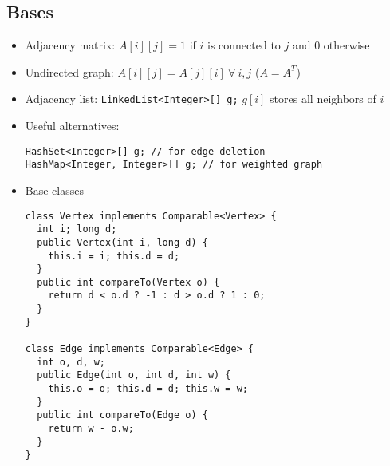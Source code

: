 \subsection{Bases}
\begin{itemize}
\item Adjacency matrix: $A[i][j] = 1$ if $i$ is connected to $j$ and $0$ otherwise
\item Undirected graph: $A[i][j] = A[j][i]\ \forall\ i,j$ ($A = A^T$)
\item Adjacency list: \lstinline|LinkedList<Integer>[] g;|
$g[i]$ stores all neighbors of $i$
\item Useful alternatives: 
\begin{lstlisting}
HashSet<Integer>[] g; // for edge deletion
HashMap<Integer, Integer>[] g; // for weighted graph
\end{lstlisting}
\item Base classes
\begin{lstlisting}
class Vertex implements Comparable<Vertex> {
  int i; long d;
  public Vertex(int i, long d) { 
  	this.i = i; this.d = d;
  }
  public int compareTo(Vertex o) {
  	return d < o.d ? -1 : d > o.d ? 1 : 0;
  }
}

class Edge implements Comparable<Edge> {
  int o, d, w;
  public Edge(int o, int d, int w) {
    this.o = o; this.d = d; this.w = w;
  }
  public int compareTo(Edge o) {
    return w - o.w;
  }
}
\end{lstlisting}
\end{itemize}